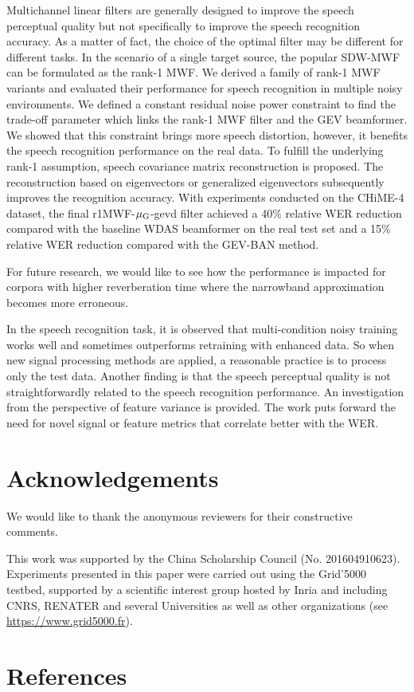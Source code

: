 \documentclass[review]{elsarticle}
\newif\ifproofread
\newcommand{\pfmarker}[1]{%
\ifproofread
\textcolor{red}{#1}%
\else
#1%
\fi
}
\newif\ifminorR
\newcommand{\pfminor}[1]{%
\ifminorR
\textcolor{red}{#1}%
\else
#1%
\fi
}
\begin{document}
Multichannel linear filters are generally designed to improve the speech perceptual quality but not specifically to improve the speech recognition accuracy. As a matter of fact, the choice of the optimal filter may be different for different tasks. In the scenario of a single target source, the popular SDW-MWF can be formulated as the rank-1 MWF. We derived a family of rank-1 MWF variants and evaluated their performance for speech recognition in multiple noisy environments. We defined a constant residual noise power constraint to find the trade-off parameter which links the rank-1 MWF filter and the GEV beamformer. We showed that this constraint brings more speech distortion, however, it benefits the speech recognition performance on the real data. To fulfill the underlying rank-1 assumption, speech covariance matrix reconstruction is proposed. The reconstruction based on eigenvectors or generalized eigenvectors subsequently improves the recognition accuracy. With experiments conducted on the CHiME-4 dataset, the final r1MWF-$\mu_{\text G}$-gevd filter achieved a 40\% relative WER reduction compared with the baseline WDAS beamformer on the real test set and a 15\% relative WER reduction compared with the GEV-BAN method. \pfmarker{For future research, we would like to see how the performance is impacted for corpora with higher reverberation time where the narrowband approximation becomes more erroneous.}

In the speech recognition task, it is observed that multi-condition noisy training works well and sometimes outperforms retraining with enhanced data. So when new signal processing methods are applied, a reasonable practice is to process only the test data. Another finding is that the speech perceptual quality is not straightforwardly related to the speech recognition performance. An investigation from the perspective of feature variance is provided. The work puts forward the need for novel signal or feature metrics that correlate better with the WER.

\section{Acknowledgements}

\pfminor{We would like to thank the anonymous reviewers for their constructive comments.} This work was supported by the China Scholarship Council (No. 201604910623). Experiments presented in this paper were carried out using the Grid'5000 testbed, supported by a scientific interest group hosted by Inria and including CNRS, RENATER and several Universities as well as other organizations (see \url{https://www.grid5000.fr}).

\section*{References}


\end{document}
